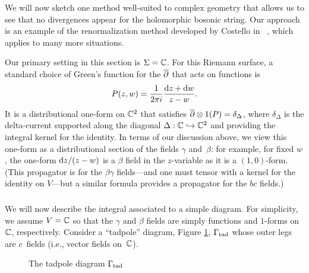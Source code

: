 We will now sketch one method well-suited to complex geometry
that allows us to see that no divergences appear for the holomorphic bosonic string.
Our approach is an example of the renormalization method developed by Costello in ~\cite{CosBook},
which applies to many more situations.

Our primary setting in this section is $\Sigma=\mathbb C$.
For this Riemann surface, 
a standard choice of Green's function for the $\overline{\partial}$ that acts on functions is
\[
P(z,w) = \frac{1}{2 \pi i} \frac{{\rm d} z + {\rm d} w}{z-w}.
\]
It is a distributional one-form on $\mathbb C^2$ that satisfies $\overline{\partial} \otimes 1(P) = \delta_\Delta$, 
where $\delta_\Delta$ is the delta-current supported along the diagonal $\Delta: \mathbb C \hookrightarrow \mathbb C^2$ and providing the integral kernel for the identity.
In terms of our discussion above,
we view this one-form as a distributional section of the fields $\gamma$ and~$\beta$: 
for example, for fixed $w$, the one-form ${\rm d} z/(z - w)$ is a $\beta$ field in the $z$-variable 
as it is a $(1,0)$-form.
(This propagator is for the $\beta\gamma$ fields---and one must tensor with a kernel for the identity on $V$---but a similar formula provides a propagator for the $bc$ fields.)

\subsubsection{}

We will now describe the integral associated to a simple diagram.
For simplicity, we assume $V = \mathbb C$ so that the $\gamma$ and $\beta$ fields are simply functions and $1$-forms on $\mathbb C$, respectively.
Consider a ``tadpole'' diagram, Figure \ref{fig:tadpole}, $\Gamma_{\rm tad}$ whose outer legs are $c$~fields 
(i.e., vector fields on~$\mathbb C$).

\begin{figure}
\caption{The tadpole diagram $\Gamma_{\rm tad}$}
\label{fig:tadpole}
\end{figure}


